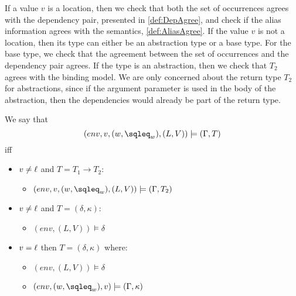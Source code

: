 \documentclass{eptcs}
\begin{document}
If a value $v$ is a location, then we check that both the set of occurrences agrees with the dependency pair, presented in \cref{def:DepAgree}, 
and check if the alias information agrees with the semantics, \cref{def:AliasAgree}.
If the value $v$ is not a location, then its type can either be an
abstraction type or a base type.
For the base type, we check that the agreement between the set of occurrences and the dependency pair agrees.
If the type is an abstraction, then we check that $T_2$ agrees with 
the binding model. 
We are only concerned about the return type $T_2$ for abstractions,
since if the argument parameter is used in the body of the
abstraction, then the dependencies would already be part of the return
type. 

\begin{definition}\label{def:TAgree}
	We say that
	$$(env,v,(w,\sqleq_w),(L,V))\models(\Gamma,T)$$
	iff
	\begin{itemize}
		\item $v\neq\ell$ and $T=T_1\rightarrow T_2$:
		\begin{itemize}
			\item $(env,v,(w,\sqleq_w),(L,V))\models(\Gamma,T_2)$
		\end{itemize}

		\item $v\neq\ell$ and $T=(\delta,\kappa)$:
		\begin{itemize}
			\item $(env,(L,V))\models\delta$
		\end{itemize}

		\item $v=\ell$ then $T=(\delta,\kappa)$ where:
		\begin{itemize}
			\item $(env,(L,V))\models\delta$
			\item $(env,(w,\sqleq_w),v)\models(\Gamma,\kappa)$
		\end{itemize}
	\end{itemize}
\end{definition}
\end{document}
